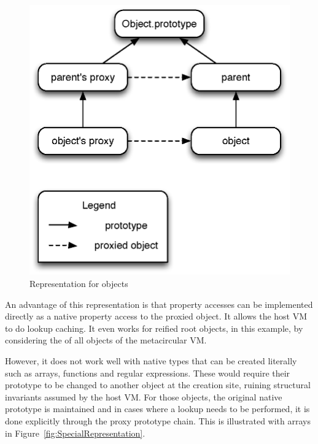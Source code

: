 \begin{figure}[htb]
\begin{center}
\includegraphics[scale=0.75]{figures/objectRepresentation}
\caption{\label{fig:BasicRepresentation} Representation for objects}
\end{center}
\end{figure}

An advantage of this representation is that property accesses can be
implemented directly as a native property access to the proxied object. It
allows the host VM to do lookup caching. It even works for reified root
objects, in this example, by considering  the 
of all objects of the metacircular VM.

However, it does not work well with native types that can be created literally
such as arrays, functions and regular expressions. These would require their
prototype to be changed to another object at the creation site, ruining
structural invariants assumed by the host VM. For those objects, the original
native prototype is maintained and in cases where a lookup needs to be
performed, it is done explicitly through the proxy prototype chain. This is
illustrated with arrays in Figure~\ref{fig:SpecialRepresentation}.

